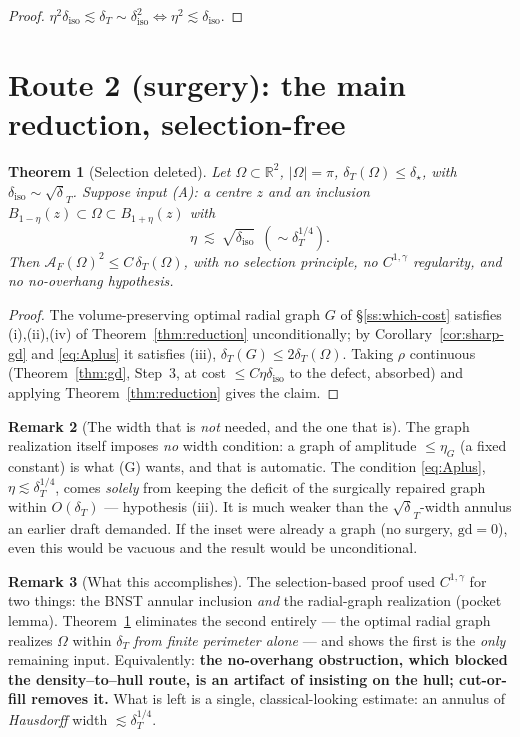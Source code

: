 \documentclass[11pt]{article}
\newtheorem{theorem}{Theorem}
\theoremstyle{definition}
\newtheorem{remark}[theorem]{Remark}
\newcommand{\R}{\mathbb R}
\newcommand{\Om}{\Omega}
\newcommand{\dT}{\delta_T}
\newcommand{\diso}{\delta_{\mathrm{iso}}}
\newcommand{\AF}{\mathcal A_F}
\newcommand{\gd}{\mathrm{gd}}
\newcommand{\abs}[1]{\left|#1\right|}
\begin{document}
\begin{proof}
$\eta^2\diso\lesssim\dT\sim\diso^2\iff\eta^2\lesssim\diso$.
\end{proof}

\section{Route 2 (surgery): the main reduction, selection-free}
\label{sec:input-A}

\begin{theorem}[Selection deleted]\label{thm:reduction-final}
Let $\Om\subset\R^2$, $\abs\Om=\pi$, $\dT(\Om)\le\delta_\star$, with
$\diso\sim\sqrt\dT$. Suppose input \textup{(A)}: a centre $z$ and an
inclusion $B_{1-\eta}(z)\subset\Om\subset B_{1+\eta}(z)$ with
\begin{equation}\label{eq:Aplus}
   \eta\ \lesssim\ \sqrt{\diso}\ \ (\sim\dT^{1/4}).
\end{equation}
Then $\AF(\Om)^2\le C\,\dT(\Om)$, with \emph{no selection principle, no
$C^{1,\gamma}$ regularity, and no no-overhang hypothesis}.
\end{theorem}

\begin{proof}
The volume-preserving optimal radial graph $G$ of \S\ref{ss:which-cost}
satisfies (i),(ii),(iv) of Theorem~\ref{thm:reduction} unconditionally;
by Corollary~\ref{cor:sharp-gd} and \eqref{eq:Aplus} it satisfies (iii),
$\dT(G)\le 2\dT(\Om)$. Taking $\rho$ continuous (Theorem~\ref{thm:gd},
Step~3, at cost $\le C\eta\diso$ to the defect, absorbed) and applying
Theorem~\ref{thm:reduction} gives the claim.
\end{proof}

\begin{remark}[The width that is \emph{not} needed, and the one that is]
\label{rem:width}
The graph realization itself imposes \emph{no} width condition: a graph of
amplitude $\le\eta_G$ (a fixed constant) is what (G) wants, and that is
automatic. The condition \eqref{eq:Aplus}, $\eta\lesssim\dT^{1/4}$, comes
\emph{solely} from keeping the deficit of the surgically repaired graph
within $O(\dT)$ --- hypothesis (iii). It is much weaker than the
$\sqrt\dT$-width annulus an earlier draft demanded. If the inset were
already a graph (no surgery, $\gd=0$), even this would be vacuous and the
result would be unconditional.
\end{remark}

\begin{remark}[What this accomplishes]\label{rem:accomplish}
The selection-based proof used $C^{1,\gamma}$ for two things: the BNST
annular inclusion \emph{and} the radial-graph realization (pocket lemma).
Theorem~\ref{thm:reduction-final} eliminates the second entirely --- the
optimal radial graph realizes $\Om$ within $\dT$ \emph{from finite
perimeter alone} --- and shows the first is the \emph{only} remaining
input. Equivalently: \textbf{the no-overhang obstruction, which blocked the
density--to--hull route, is an artifact of insisting on the hull;
cut-or-fill removes it.} What is left is a single, classical-looking
estimate: an annulus of \emph{Hausdorff} width $\lesssim\dT^{1/4}$.
\end{remark}
\end{document}
